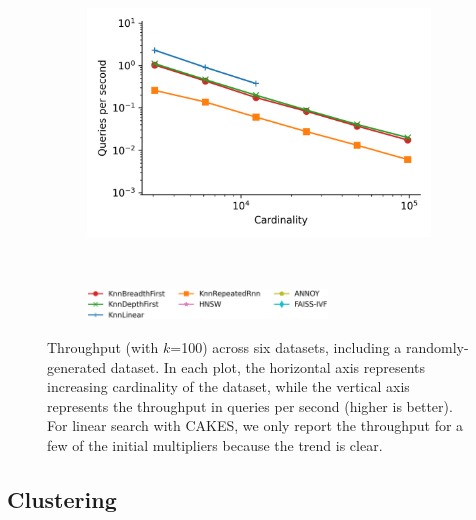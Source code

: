 \documentclass[review,supplement,onefignum,onetabnum]{siamonline220329}
\begin{document}
\begin{figure}
\begin{subfigure}[b]{0.47\textwidth}
        \label{fig:supplement:silva-scaling}
    \end{subfigure}%
    \begin{subfigure}[b]{0.47\textwidth}
        \includegraphics[width=1.0\textwidth]{plots/radio-ml_Ball_100_throughput.png}
        \label{fig:supplement:radioml-scaling}
    \end{subfigure}%
    \\
    \begin{subfigure}[b]{0.94\textwidth}
        \centering
        \includegraphics[width=0.7\textwidth]{plots/legend.png}
        \label{fig:supplement:scaling-legend}
    \end{subfigure}%
    \caption{Throughput (with $k$=100) across six datasets, including a randomly-generated dataset.
    In each plot, the horizontal axis represents increasing cardinality of the dataset, while the vertical axis represents the throughput in queries per second (higher is better).
    For linear search with CAKES, we only report the throughput for a few of the initial multipliers because the trend is clear.}
    \label{fig:supplement:scaling-plots}
\end{figure}


\subsection{Clustering}
\end{document}
